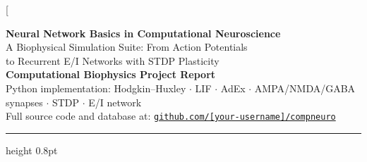 \documentclass[11pt, a4paper, twocolumn]{article}
\begin{document}
\twocolumn[{%
\begin{@twocolumnfalse}

\begin{center}

{\LARGE\bfseries\color{blue!70!black}
  Neural Network Basics in Computational Neuroscience}\\[6pt]
{\large
  A Biophysical Simulation Suite: From Action Potentials\\
  to Recurrent E/I Networks with STDP Plasticity}\\[12pt]

{\normalsize
  \textbf{Computational Biophysics Project Report}\\[4pt]
  Python implementation: Hodgkin--Huxley $\cdot$ LIF $\cdot$ AdEx $\cdot$
  AMPA/NMDA/GABA synapses $\cdot$ STDP $\cdot$ E/I network\\[4pt]
  Full source code and database at:
  \texttt{\href{https://github.com/}{github.com/[your-username]/compneuro}}
}

\vspace{8pt}
\hrule height 0.8pt
\vspace{8pt}


\end{center}
\end{@twocolumnfalse}}
\end{document}
